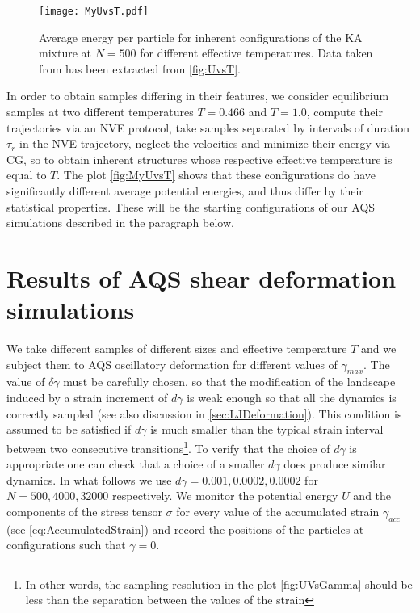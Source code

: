 \begin{figure}[!h] 
\centering 
\texttt{[image: MyUvsT.pdf]} 
\caption{Average energy per particle for inherent configurations of the KA mixture at $N=500$ for different effective temperatures. Data taken from \cite{lacks2004energy} has been extracted from \autoref{fig:UvsT}. \label{fig:MyUvsT}}
\end{figure}

In order to obtain samples differing in their features, we consider equilibrium samples at two different temperatures $T=0.466$ and $T=1.0$, compute their trajectories via an NVE protocol, take samples separated by intervals of duration $\tau_{r}$ in the NVE trajectory, neglect the velocities and minimize their energy via CG, so to obtain inherent structures whose respective effective temperature is equal to $T$. The plot \autoref{fig:MyUvsT} shows that these configurations do have significantly different average potential energies, and thus differ by their statistical properties.
These will be the starting configurations of our AQS simulations described in the paragraph below. 

\section{Results of AQS shear deformation simulations}

We take different samples of different sizes and effective temperature $T$ and we subject them to AQS oscillatory deformation for different values of $\gamma_{max}$. The value of $\delta \gamma$ must be carefully chosen, so that the modification of the landscape induced by a strain increment of $d\gamma$ is weak enough so that all the dynamics is correctly sampled (see also discussion in \autoref{sec:LJDeformation}). This condition is assumed to be satisfied if $d\gamma$ is much smaller than the typical strain interval between two consecutive transitions\footnote{In other words, the sampling resolution in the plot \autoref{fig:UVsGamma} should be less than the separation between the values of the strain }. To verify that the choice of $d\gamma$ is appropriate one can check that a choice of a smaller $d\gamma$ does produce similar dynamics. In what follows we use $d\gamma = 0.001, 0.0002, 0.0002$ for $N = 500, 4000, 32000$ respectively.
We monitor the potential energy $U$ and the components of the stress tensor $\sigma$ for every value of the accumulated strain $\gamma_{acc}$ (see \autoref{eq:AccumulatedStrain}) and record the positions of the particles at configurations such that $\gamma = 0$. 

